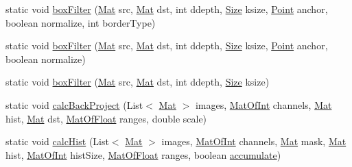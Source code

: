 \begin{DoxyCompactItemize}
\item 
static void \mbox{\hyperlink{classorg_1_1opencv_1_1imgproc_1_1_imgproc_afb9afdc474cdb1b9242cf16ffc7017e3}{box\+Filter}} (\mbox{\hyperlink{classorg_1_1opencv_1_1core_1_1_mat}{Mat}} src, \mbox{\hyperlink{classorg_1_1opencv_1_1core_1_1_mat}{Mat}} dst, int ddepth, \mbox{\hyperlink{classorg_1_1opencv_1_1core_1_1_size}{Size}} ksize, \mbox{\hyperlink{classorg_1_1opencv_1_1core_1_1_point}{Point}} anchor, boolean normalize, int border\+Type)
\item 
static void \mbox{\hyperlink{classorg_1_1opencv_1_1imgproc_1_1_imgproc_a064f2f5351affaec5ad2c3b88c957faa}{box\+Filter}} (\mbox{\hyperlink{classorg_1_1opencv_1_1core_1_1_mat}{Mat}} src, \mbox{\hyperlink{classorg_1_1opencv_1_1core_1_1_mat}{Mat}} dst, int ddepth, \mbox{\hyperlink{classorg_1_1opencv_1_1core_1_1_size}{Size}} ksize, \mbox{\hyperlink{classorg_1_1opencv_1_1core_1_1_point}{Point}} anchor, boolean normalize)
\item 
static void \mbox{\hyperlink{classorg_1_1opencv_1_1imgproc_1_1_imgproc_a0e852635eaf9272b1ec800779c4cbeee}{box\+Filter}} (\mbox{\hyperlink{classorg_1_1opencv_1_1core_1_1_mat}{Mat}} src, \mbox{\hyperlink{classorg_1_1opencv_1_1core_1_1_mat}{Mat}} dst, int ddepth, \mbox{\hyperlink{classorg_1_1opencv_1_1core_1_1_size}{Size}} ksize)
\item 
static void \mbox{\hyperlink{classorg_1_1opencv_1_1imgproc_1_1_imgproc_abba70e493f86780d2850082607a94395}{calc\+Back\+Project}} (List$<$ \mbox{\hyperlink{classorg_1_1opencv_1_1core_1_1_mat}{Mat}} $>$ images, \mbox{\hyperlink{classorg_1_1opencv_1_1core_1_1_mat_of_int}{Mat\+Of\+Int}} channels, \mbox{\hyperlink{classorg_1_1opencv_1_1core_1_1_mat}{Mat}} hist, \mbox{\hyperlink{classorg_1_1opencv_1_1core_1_1_mat}{Mat}} dst, \mbox{\hyperlink{classorg_1_1opencv_1_1core_1_1_mat_of_float}{Mat\+Of\+Float}} ranges, double scale)
\item 
static void \mbox{\hyperlink{classorg_1_1opencv_1_1imgproc_1_1_imgproc_a407bd992b986d8e6d0ccf661a1058b57}{calc\+Hist}} (List$<$ \mbox{\hyperlink{classorg_1_1opencv_1_1core_1_1_mat}{Mat}} $>$ images, \mbox{\hyperlink{classorg_1_1opencv_1_1core_1_1_mat_of_int}{Mat\+Of\+Int}} channels, \mbox{\hyperlink{classorg_1_1opencv_1_1core_1_1_mat}{Mat}} mask, \mbox{\hyperlink{classorg_1_1opencv_1_1core_1_1_mat}{Mat}} hist, \mbox{\hyperlink{classorg_1_1opencv_1_1core_1_1_mat_of_int}{Mat\+Of\+Int}} hist\+Size, \mbox{\hyperlink{classorg_1_1opencv_1_1core_1_1_mat_of_float}{Mat\+Of\+Float}} ranges, boolean \mbox{\hyperlink{classorg_1_1opencv_1_1imgproc_1_1_imgproc_a9258592f2447fc25785020eee8cc78f7}{accumulate}})

\end{DoxyCompactItemize}
